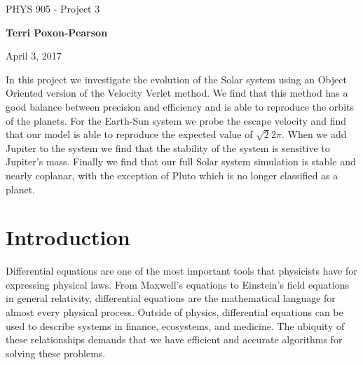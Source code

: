 \documentclass[%
oneside,                 %
final,                   %
10pt]{article}
\begin{document}

\newcommand{\exercisesection}[1]{\subsection*{#1}}






\thispagestyle{empty}

\begin{center}
{\LARGE\bf
\begin{spacing}{1.25}
PHYS 905 - Project 3
\end{spacing}
}
\end{center}


\begin{center}
{\bf Terri Poxon-Pearson}
\end{center}

    

\begin{center}
April 3, 2017
\end{center}

\vspace{1cm}

In this project we investigate the evolution of the Solar system using an Object Oriented version of the Velocity Verlet method.  We find that this method has a good balance between precision and efficiency and is able to reproduce the orbits of the planets.  For the Earth-Sun system we probe the escape velocity and find that our model is able to reproduce the expected value of $\sqrt{2}2\pi$.  When we add Jupiter to the system we find that the stability of the system is sensitive to Jupiter's mass.  Finally we find that our full Solar system simulation is stable and nearly coplanar, with the exception of Pluto which is no longer classified as a planet.

\tableofcontents
 
\section{Introduction}

Differential equations are one of the most important tools that physicists have for expressing physical laws.  From Maxwell's equations to Einstein's field equations in general relativity, differential equations are the mathematical language for almost every physical process.  Outside of physics, differential equations can be used to describe systems in finance, ecosystems, and medicine.  The ubiquity of these relationships demands that we have efficient and accurate algorithms for solving these problems.
\end{document}
